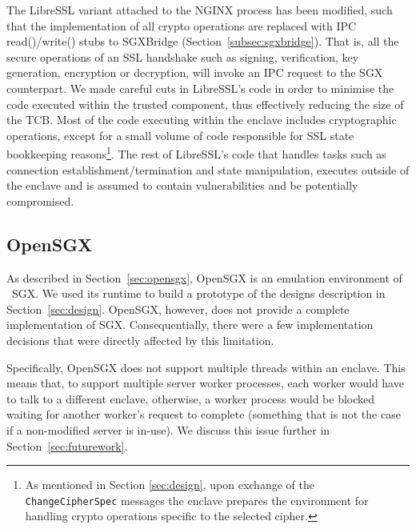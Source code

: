 \documentclass[../main.tex]{subfiles}
\begin{document}
The LibreSSL variant attached to the NGINX process has been modified,
such that the implementation of all crypto operations are replaced
with IPC read()/write() stubs to SGXBridge
(Section~\ref{subsec:sgxbridge}). That is, all the secure operations
of an SSL handshake such as signing, verification, key generation,
encryption or decryption, will invoke an IPC request to the SGX
counterpart. We made careful cuts in LibreSSL's code in order to
minimise the code executed within the trusted component, thus
effectively reducing the size of the TCB. Most of the code executing
within the enclave includes cryptographic operations, except for a
small volume of code responsible for SSL state bookkeeping
reasons\footnote{As mentioned in Section \ref{sec:design}, upon
  exchange of the \texttt{ChangeCipherSpec} messages the enclave
  prepares the environment for handling crypto operations specific to
  the selected cipher.}. The rest of LibreSSL's code that handles
tasks such as connection establishment/termination and state
manipulation, executes outside of the enclave and is assumed to
contain vulnerabilities and be potentially compromised.

\subsection{OpenSGX}
\label{subsec:opensgx}
As described in Section~\ref{sec:opensgx}, OpenSGX is an emulation
environment of \Intel~SGX. We used its runtime to build a prototype of
the designs description in Section~\ref{sec:design}. OpenSGX, however,
does not provide a complete implementation of SGX. Consequentially,
there were a few implementation decisions that were directly affected
by this limitation.

Specifically, OpenSGX does not support multiple threads within an
enclave. This means that, to support multiple server worker processes,
each worker would have to talk to a different enclave, otherwise, a
worker process would be blocked waiting for another worker's request
to complete (something that is not the case if a non-modified server
is in-use). We discuss this issue further in
Section~\ref{sec:futurework}.
\end{document}
